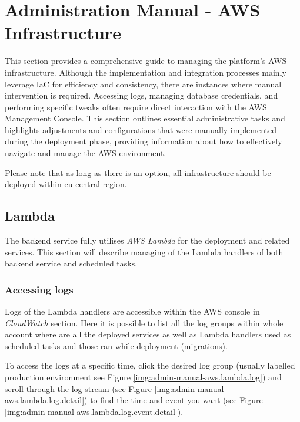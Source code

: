\section{Administration Manual - AWS Infrastructure}
\label{attachments:admin-manual-aws-platform}
This section provides a comprehensive guide to managing the platform's AWS infrastructure. 
Although the implementation and integration processes mainly leverage \ac{IaC} for efficiency and consistency, there are instances where manual intervention is required. 
Accessing logs, managing database credentials, and performing specific tweaks often require direct interaction with the AWS Management Console. 
This section outlines essential administrative tasks and highlights adjustments and configurations that were manually implemented during the deployment phase, providing information about how to effectively navigate and manage the AWS environment.

Please note that as long as there is an option, all infrastructure should be deployed within eu-central region.

\subsection{Lambda}
The backend service fully utilises \textit{AWS Lambda} for the deployment and related services. 
This section will describe managing of the Lambda handlers of both backend service and scheduled tasks.


\subsubsection{Accessing logs}
Logs of the Lambda handlers are accessible within the AWS console in \textit{CloudWatch} section.
Here it is possible to list all the log groups within whole account where are all the deployed services as well as Lambda handlers used as scheduled tasks and those ran while deployment (migrations).

To access the logs at a specific time, click the desired log group (usually labelled production environment see Figure \ref{img:admin-manual-aws.lambda.log}) and scroll through the log stream (see Figure \ref{img:admin-manual-aws.lambda.log.detail}) to find the time and event you want (see Figure \ref{img:admin-manual-aws.lambda.log.event.detail}).

